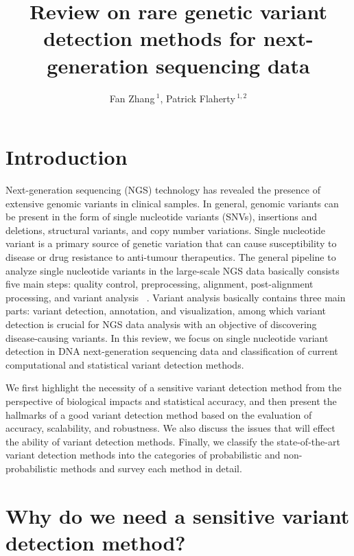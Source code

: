 \documentclass[11pt,reqno]{amsart}
\title[Reveiw on RVD Methods]{Review on rare genetic variant detection methods for next-generation sequencing data}
\author[F. Zhang AND P. Flaherty]{Fan Zhang\,$^{1}$, Patrick Flaherty\,$^{1,2}$}
\begin{document}
\maketitle

\section{Introduction}
Next-generation sequencing (NGS) technology has revealed the presence of extensive genomic variants in clinical samples.
In general, genomic variants can be present in the form of single nucleotide variants (SNVs), insertions and deletions, structural variants, and copy number variations.
Single nucleotide variant is a primary source of genetic variation that can cause susceptibility to disease or drug resistance to  anti-tumour therapeutics.
The general pipeline to analyze single nucleotide variants in the large-scale NGS data basically consists five main steps: quality control, preprocessing, alignment, post-alignment processing, and variant analysis ~\citep{Bao2014}.
Variant analysis basically contains three main parts: variant detection, annotation, and visualization, among which variant detection is crucial for NGS data analysis with an objective of discovering disease-causing variants.
In this review, we focus on single nucleotide variant detection in DNA next-generation sequencing data and classification of current computational and statistical variant detection methods.

We first highlight the necessity of a sensitive variant detection method from the perspective of biological impacts and statistical accuracy,
and then present the hallmarks of a good variant detection method based on the evaluation of accuracy, scalability, and robustness.
We also discuss the issues that will effect the ability of variant detection methods.
Finally, we classify the state-of-the-art variant detection methods into the categories of probabilistic and non-probabilistic methods and survey each method in detail.


\section{Why do we need a sensitive variant detection method?}
\end{document}
